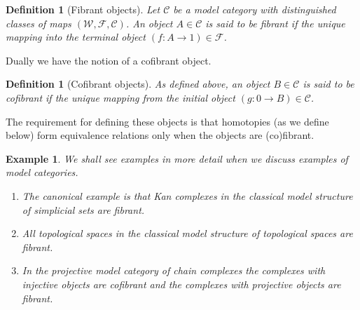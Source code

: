 \documentclass[12pt]{report}
\numberwithin{equation}{section}
\newtheorem{definition}[dummy]{Definition}
\newtheorem{example}[dummy]{Example}
\begin{document}
	
	\begin{definition}[Fibrant objects]
		Let $\mathcal{C}$ be a model category with distinguished classes of maps $(\mathcal{W,F,C})$. An object $A \in \mathcal{C}$ is said to be fibrant if the unique mapping into the terminal object $(f: A \to 1) \in \mathcal{F}$.
	\end{definition}
	Dually we have the notion of a cofibrant object.
	\begin{definition}[Cofibrant objects]
		As defined above, an object $B \in \mathcal{C}$ is said to be cofibrant if the unique mapping from the initial object $(g:0 \to B) \in \mathcal{C}$.
	\end{definition}
	
	The requirement for defining these objects is that homotopies (as we define below) form equivalence relations only when the objects are (co)fibrant.
	
	\begin{example}
		We shall see examples in more detail when we discuss examples of model categories. 
		\begin{enumerate}
			\item The canonical example is that Kan complexes in the classical model structure of simplicial sets are fibrant. 
			\item All topological spaces in the classical model structure of topological spaces are fibrant.
			\item In the projective model category of chain complexes the complexes with injective objects are cofibrant and the complexes with projective objects are fibrant.
		\end{enumerate}
		
	\end{example}
	
\end{document}
